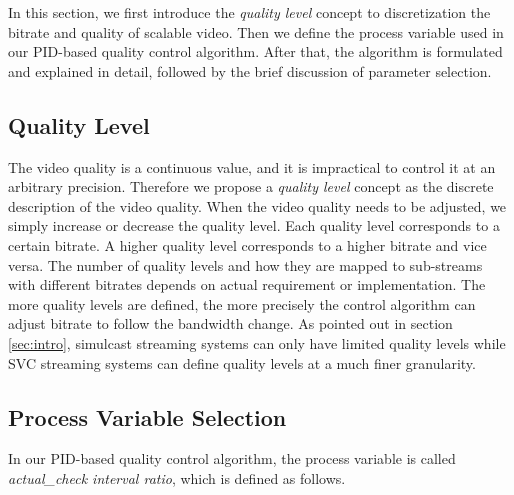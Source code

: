 \documentclass[journal]{IEEEtran}
\begin{document}
In this section, we first introduce the \textit{quality level} concept to discretization the bitrate and quality of scalable video. Then we define the process variable used in our PID-based quality control algorithm. After that, the algorithm is formulated and explained in detail, followed by the brief discussion of parameter selection.

\subsection{Quality Level}
\label{subsec:quality-level}

The video quality is a continuous value, and it is impractical to control it at an arbitrary precision. Therefore we propose a \textit{quality level} concept as the discrete description of the video quality. When the video quality needs to be adjusted, we simply increase or decrease the quality level. Each quality level corresponds to a certain bitrate. A higher quality level corresponds to a higher bitrate and vice versa. The number of quality levels and how they are mapped to sub-streams with different bitrates depends on actual requirement or implementation. The more quality levels are defined, the more precisely the control algorithm can adjust bitrate to follow the bandwidth change. As pointed out in section \ref{sec:intro}, simulcast streaming systems can only have limited quality levels while SVC streaming systems can define quality levels at a much finer granularity.

\subsection{Process Variable Selection}
\label{subsec:process-variable}

In our PID-based quality control algorithm, the process variable is called \textit{actual\_check interval ratio}, which is defined as follows.
\end{document}

